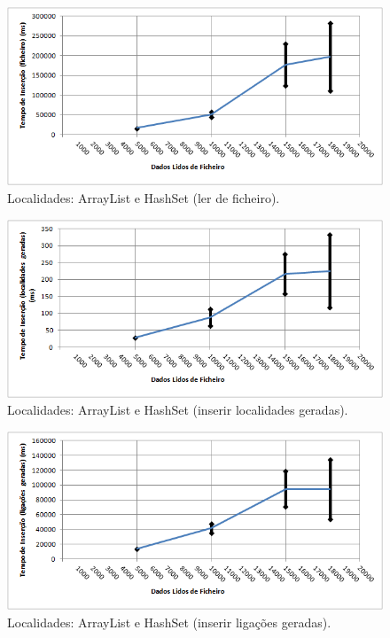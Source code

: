 \documentclass[a5paper,twocolumn, 11pt]{article}
\begin{document}
\begin{figure}[h!b!t!]
    \caption[Localidades: ArrayList e HashSet (ler de ficheiro)]{Localidades: ArrayList e HashSet (ler de ficheiro).}
    \label{hashtable}
    \centering
        \includegraphics[width=400pt]{cloc_conf2_o1.png}
\end{figure}
\begin{figure}[h!b!t!]
    \caption[Localidades: ArrayList e HashSet (inserir localidades geradas)]{Localidades: ArrayList e HashSet (inserir localidades geradas).}
    \label{hashtable}
    \centering
        \includegraphics[width=400pt]{cloc_conf2_o2.png}
\end{figure}
\begin{figure}[h!b!t!]
    \caption[Localidades: ArrayList e HashSet (inserir ligações geradas)]{Localidades: ArrayList e HashSet (inserir ligações geradas).}
    \label{hashtable}
    \centering
        \includegraphics[width=400pt]{cloc_conf2_o3.png}
\end{figure}
\end{document}
